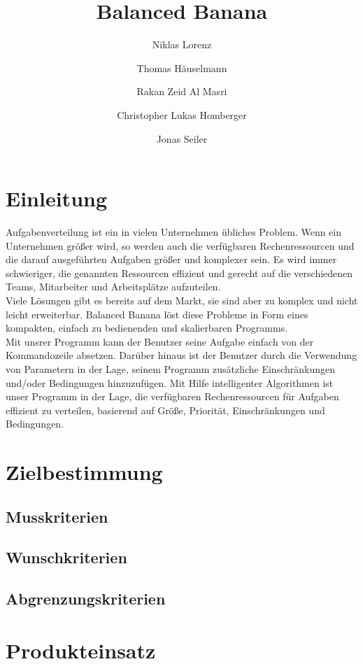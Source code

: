 \documentclass[a4paper,12pt]{article}
\title{Balanced Banana}
\author{Niklas Lorenz \and Thomas Häuselmann \and Rakan Zeid Al Masri \and Christopher Lukas Homberger \and Jonas Seiler}
\begin{document}
\setcounter{page}{2}
\tableofcontents          %
\clearpage
{}

\section{Einleitung}
\vspace*{1.5cm}
Aufgabenverteilung ist ein in vielen Unternehmen übliches Problem. Wenn ein Unternehmen größer wird, 
so werden auch die verfügbaren Rechenressourcen und die darauf ausgeführten Aufgaben größer und komplexer sein. Es wird immer schwieriger, die genannten Ressourcen effizient und gerecht auf die verschiedenen Teams, Mitarbeiter und Arbeitsplätze aufzuteilen. \\

Viele Lösungen gibt es bereits auf dem Markt, sie sind aber zu komplex und nicht leicht erweiterbar. Balanced Banana löst diese Probleme in Form eines kompakten, einfach zu bedienenden und skalierbaren Programms. \\

Mit unsrer Programm kann der Benutzer seine Aufgabe einfach von der Kommandozeile absetzen. Darüber hinaus ist der Benutzer durch die Verwendung von Parametern in der Lage, seinem Programm zusätzliche Einschränkungen und/oder Bedingungen hinzuzufügen. Mit Hilfe intelligenter Algorithmen ist unser Programm in der Lage, die verfügbaren Rechenressourcen für Aufgaben effizient zu verteilen, basierend auf Größe, Priorität, Einschränkungen und Bedingungen.

\section{Zielbestimmung}
\subsection{Musskriterien}
\subsection{Wunschkriterien}
\subsection{Abgrenzungskriterien}

\section{Produkteinsatz}
\end{document}
